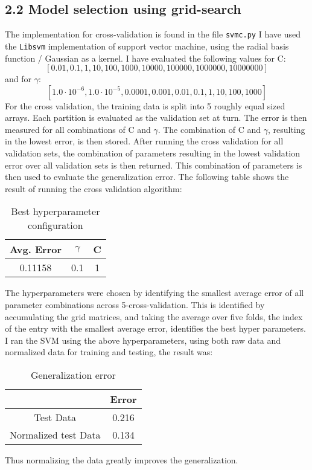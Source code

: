 \documentclass{article}
\begin{document}
\subsection{2.2 Model selection using grid-search}
The implementation for cross-validation is found in the file \texttt{svmc.py}
I have used the \texttt{Libsvm} implementation of support vector machine, using the radial basis function / Gaussian as a kernel. I have evaluated the following values for C: 
$$ [0.01, 0.1, 1, 10, 100, 1000, 10000, 100000, 1000000, 10000000] $$
and for $\gamma$:
$$
[1.0 \cdot 10^{-6}, 1.0 \cdot 10^{-5}, 0.0001, 0.001, 0.01, 0.1, 1, 10, 100, 1000]$$
For the cross validation, the training data is split into 5 roughly equal sized arrays. Each partition is evaluated as the validation set at turn. The error is then measured for all combinations of C and $\gamma$. The combination of C and $\gamma$, resulting in the lowest error, is then stored. After running the cross validation for all validation sets, the combination of parameters resulting in the lowest validation error over all validation sets is then returned. This combination of parameters is then used to evaluate the generalization error.  The following table shows the result of running the cross validation algorithm:
\begin{table}[H]
\centering
\caption{Best hyperparameter configuration}
\label{}
\begin{tabular}{|c|c|c|} 
\hline
Avg. Error & $\gamma$   & C  \\
 \hline
 0.11158 & 0.1 & 1 \\
 \hline
\end{tabular}
\end{table}
The hyperparameters were chosen by identifying the smallest average error of all parameter combinations across 5-cross-validation. This is identified by accumulating the grid matrices, and taking the average over five folds, the index of the entry with the smallest  average error, identifies the best hyper parameters. \\ I ran the SVM using the above hyperparameters, using both raw data and normalized data for training and testing, the result was:
\begin{table}[H]
\centering
\caption{Generalization error}
\label{}
\begin{tabular}{|c|c|} 
\hline
 & Error \\
 \hline
 Test Data & 0.216
 \\
 \hline
 Normalized test Data & 0.134
 \\
 \hline
\end{tabular}
\end{table}
Thus normalizing the data greatly improves the generalization.
\end{document}
